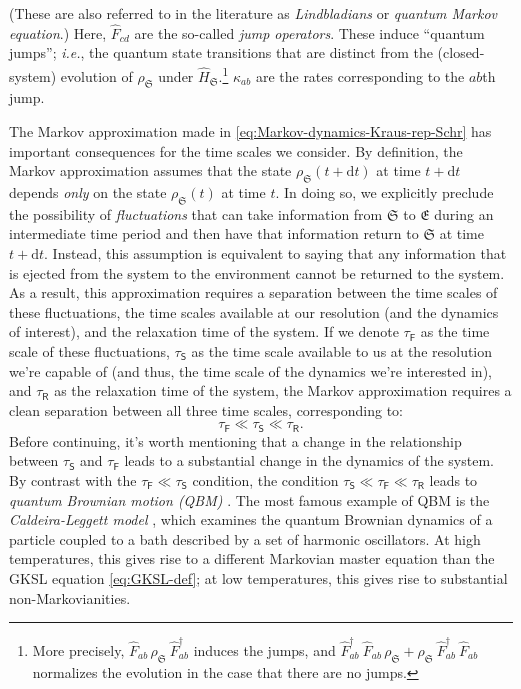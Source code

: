 \documentclass[preprints,article,accept,moreauthors,pdftex]{Definitions/mdpi}
\begin{document}
\begin{paracol}{2}
\switchcolumn
\noindent (These are also referred to in the literature as \emph{Lindbladians} or \emph{quantum Markov equation}.) Here, $\widehat{F}_{cd}$ are the so-called \emph{jump operators}. These induce ``quantum jumps''; \emph{i.e.}, the quantum state transitions that are distinct from the (closed-system) evolution of $\rho_{\mathfrak{S}}$ under $\widehat{H}_{\mathfrak{S}}$.\footnote{More precisely, $\widehat{F}_{ab}\,\rho_{\mathfrak{S}}\:\!\widehat{F}_{ab}^{\dagger}$ induces the jumps, and $\widehat{F}_{ab}^{\dagger}\:\!\widehat{F}_{ab}\,\rho_{\mathfrak{S}} + \rho_{\mathfrak{S}}\:\!\widehat{F}_{ab}^{\dagger}\:\!\widehat{F}_{ab}$ normalizes the evolution in the case that there are no jumps.} $\kappa_{ab}$ are the rates corresponding to the $ab$th jump. 

The Markov approximation made in \eqref{eq:Markov-dynamics-Kraus-rep-Schr} has important consequences for the time scales we consider. By definition, the Markov approximation assumes that the state $\rho_{\mathfrak{S}}\left(t + \mathrm{d}t\right)$ at time $t + \mathrm{d}t$ depends \emph{only} on the state $\rho_{\mathfrak{S}}\left(t\right)$ at time $t$. In doing so, we explicitly preclude \cite{Breuer07,Banerjee18,Preskill19} the possibility of \emph{fluctuations} that can take information from $\mathfrak{S}$ to $\mathfrak{E}$ during an intermediate time period and then have that information return to $\mathfrak{S}$ at time $t + \mathrm{d}t$. Instead, this assumption is equivalent to saying that any information that is ejected from the system to the environment cannot be returned to the system. As a result, this approximation requires a separation between the time scales of these fluctuations, the time scales available at our resolution (and the dynamics of interest), and the relaxation time of the system. If we denote $\tau_{\mathsf{F}}$ as the time scale of these fluctuations, $\tau_{\mathsf{S}}$ as the time scale available to us at the resolution we're capable of (and thus, the time scale of the dynamics we're interested in), and $\tau_{\mathsf{R}}$ as the relaxation time of the system, the Markov approximation requires a clean separation between all three time scales, corresponding to:
\begin{equation}
    \label{eq:Markov-time-scales}
    \tau_{\mathsf{F}} \ll \tau_{\mathsf{S}} \ll \tau_{\mathsf{R}}.
\end{equation}
Before continuing, it's worth mentioning that a change in the relationship between $\tau_{\mathsf{S}}$ and $\tau_{\mathsf{F}}$ leads to a substantial change in the dynamics of the system. By contrast with the $\tau_{\mathsf{F}} \ll \tau_{\mathsf{S}}$ condition, the condition $\tau_{\mathsf{S}} \ll \tau_{\mathsf{F}} \ll \tau_{\mathsf{R}}$ leads to \emph{quantum Brownian motion (QBM)} \cite{Breuer07,Banerjee18,Erdos12}. The most famous example of QBM is the \emph{Caldeira-Leggett model} \cite{CL83}, which examines the quantum Brownian dynamics of a particle coupled to a bath described by a set of harmonic oscillators. At high temperatures, this gives rise to a different Markovian master equation than the GKSL equation \eqref{eq:GKSL-def}; at low temperatures, this gives rise to substantial non-Markovianities.


\end{paracol}
\end{document}
